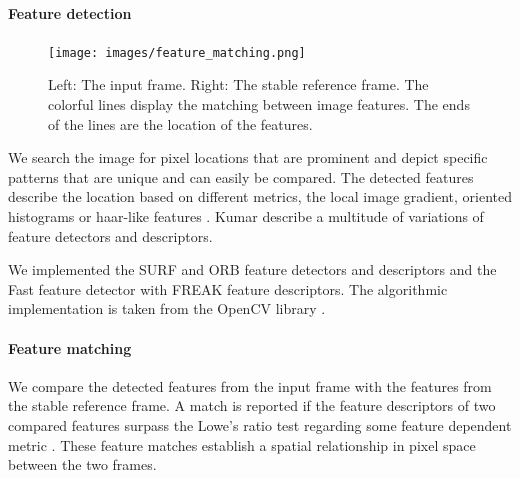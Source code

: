 \paragraph{Feature detection}
\begin{figure}[t]
   \begin{center}
      \texttt{[image: images/feature\_matching.png]}
   \end{center}
   \caption{
      Left: The input frame. 
      Right: The stable reference frame.
      The colorful lines display the matching between image features. 
      The ends of the lines are the location of the features.
       }
   \label{fig:dynamic_stabilization_feature_matching}
\end{figure}

We search the image for pixel locations that are prominent and depict specific patterns that are unique and can easily be compared.
The detected features describe the location based on different metrics, \eg{} the local image gradient, oriented histograms or haar-like features \cite{stork2001pattern}.
Kumar \etal{} \cite{kumar2014survey} describe a multitude of variations of feature detectors and descriptors.

We implemented the SURF \cite{bay10.1007/11744023_32} and ORB \cite{rublee6126544} feature detectors and descriptors and the Fast \cite{Ghahremani_2021} feature detector with FREAK \cite{alahi6247715} feature descriptors. The algorithmic implementation is taken from the OpenCV library \cite{opencv_library}. 


\paragraph{Feature matching}
We compare the detected features from the input frame with the features from the stable reference frame.
A match is reported if the feature descriptors of two compared features surpass the Lowe's ratio test \cite{lowe10.1023/B:VISI.0000029664.99615.94} regarding some feature dependent metric \cite{kumar2014survey}.
These feature matches establish a spatial relationship in pixel space between the two frames.

